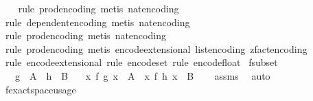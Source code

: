 \begin{isabellebody}
\ \ \isamarkupfalse%
\ {\isacharparenleft}{\kern0pt}rule\ prod{\isacharunderscore}{\kern0pt}encoding{\isacharcomma}{\kern0pt}\ metis\ nat{\isacharunderscore}{\kern0pt}encoding{\isacharparenright}{\kern0pt}\isanewline
\ \ \isamarkupfalse%
\ {\isacharparenleft}{\kern0pt}rule\ dependent{\isacharunderscore}{\kern0pt}encoding{\isacharcomma}{\kern0pt}\ metis\ nat{\isacharunderscore}{\kern0pt}encoding{\isacharparenright}{\kern0pt}\isanewline
\ \ \isamarkupfalse%
\ {\isacharparenleft}{\kern0pt}rule\ prod{\isacharunderscore}{\kern0pt}encoding{\isacharcomma}{\kern0pt}\ metis\ nat{\isacharunderscore}{\kern0pt}encoding{\isacharparenright}{\kern0pt}\isanewline
\ \ \isamarkupfalse%
\ {\isacharparenleft}{\kern0pt}rule\ prod{\isacharunderscore}{\kern0pt}encoding{\isacharcomma}{\kern0pt}\ metis\ encode{\isacharunderscore}{\kern0pt}extensional\ list{\isacharunderscore}{\kern0pt}encoding\ zfact{\isacharunderscore}{\kern0pt}encoding{\isacharparenright}{\kern0pt}\isanewline
\ \ \isamarkupfalse%
\ {\isacharparenleft}{\kern0pt}rule\ encode{\isacharunderscore}{\kern0pt}extensional{\isacharcomma}{\kern0pt}\ rule\ encode{\isacharunderscore}{\kern0pt}set{\isacharcomma}{\kern0pt}\ rule\ encode{\isacharunderscore}{\kern0pt}float{\isacharparenright}{\kern0pt}%
\endisatagproof
{\isafoldproof}%
%
\isadelimproof
\isanewline
%
\endisadelimproof
\isanewline
{}\isamarkupfalse%
\ f{\isacharunderscore}{\kern0pt}subset{\isacharcolon}{\kern0pt}\isanewline
\ \ \ {\isachardoublequoteopen}g\ {\isacharbackquote}{\kern0pt}\ A\ {\isasymsubseteq}\ h\ {\isacharbackquote}{\kern0pt}\ B{\isachardoublequoteclose}\isanewline
\ \ \ {\isachardoublequoteopen}{\isacharparenleft}{\kern0pt}{\isasymlambda}x{\isachardot}{\kern0pt}\ f\ {\isacharparenleft}{\kern0pt}g\ x{\isacharparenright}{\kern0pt}{\isacharparenright}{\kern0pt}\ {\isacharbackquote}{\kern0pt}\ A\ {\isasymsubseteq}\ {\isacharparenleft}{\kern0pt}{\isasymlambda}x{\isachardot}{\kern0pt}\ f\ {\isacharparenleft}{\kern0pt}h\ x{\isacharparenright}{\kern0pt}{\isacharparenright}{\kern0pt}\ {\isacharbackquote}{\kern0pt}\ B{\isachardoublequoteclose}\isanewline
%
\isadelimproof
\ \ %
\endisadelimproof
%
\isatagproof
{}\isamarkupfalse%
\ assms\ \isamarkupfalse%
\ auto%
\endisatagproof
{\isafoldproof}%
%
\isadelimproof
\isanewline
%
\endisadelimproof
\isanewline
{}\isamarkupfalse%
\ f{}{\isacharunderscore}{\kern0pt}exact{\isacharunderscore}{\kern0pt}space{\isacharunderscore}{\kern0pt}usage{\isacharcolon}{\kern0pt}\isanewline

\end{isabellebody}
